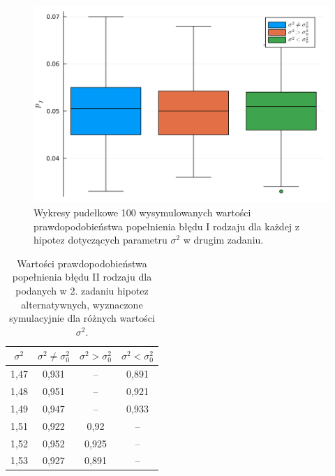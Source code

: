 \documentclass[12pt]{mwart}
\begin{document}
	\begin{figure}[H]
		\centering
		\includegraphics[scale=0.11]{images/boxplot_wariancja.png}
		\caption{Wykresy pudełkowe 100 wysymulowanych wartości prawdopodobieństwa popełnienia błędu I rodzaju dla każdej z hipotez dotyczących parametru $\sigma^2$ w drugim zadaniu.}
	\end{figure}
	
	\begin{table}[H]
		\centering
		\begin{tabular}{ |c|c|c|c| } 
			\hline
			\vphantom{ $1^{1^1}$} $\sigma^2$ \vphantom{ $1^{1^{1^1}}$} & $\sigma^2 \neq \sigma_0^2$ & $\sigma^2 > \sigma_0^2$ & $\sigma^2 < \sigma_0^2$ \\\hline
			1,47 & 0,931 & -- & 0,891 \\\hline
			1,48 & 0,951 & -- & 0,921 \\\hline
			1,49 & 0,947 & -- & 0,933 \\\hline
			1,51 & 0,922 & 0,92 & -- \\\hline
			1,52 & 0,952 & 0,925 & -- \\\hline
			1,53 & 0,927 & 0,891 & -- \\\hline
		\end{tabular}
		\caption{Wartości prawdopodobieństwa popełnienia błędu II rodzaju dla podanych w 2. zadaniu hipotez alternatywnych, wyznaczone symulacyjnie dla różnych wartości $\sigma^2$.}
	\end{table}
\end{document}
